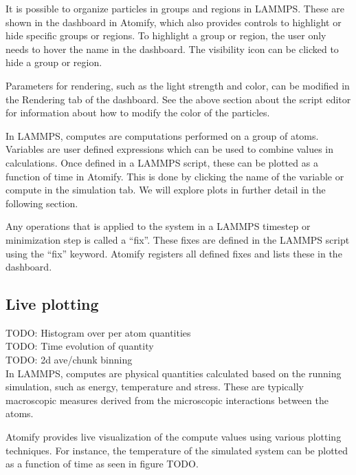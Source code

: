 \documentclass[aps,pre,twocolumn,letterpaper,floatfix,nofootinbib]{revtex4}
\begin{document}
It is possible to organize particles in groups and regions in LAMMPS.
These are shown in the dashboard in Atomify, which also provides controls to
highlight or hide specific groups or regions.
To highlight a group or region, the user only needs to hover the name in the
dashboard.
The visibility icon can be clicked to hide a group or region.

Parameters for rendering, such as the light strength and color,
can be modified in the Rendering tab of the dashboard.
See the above section about the script editor for information about how to
modify the color of the particles.

In LAMMPS, computes are computations performed on a group of atoms.
Variables are user defined expressions which can be used to combine values in
calculations.
Once defined in a LAMMPS script, these can be plotted as a function of time in
Atomify.
This is done by clicking the name of the variable or compute in the simulation
tab.
We will explore plots in further detail in the following section.

Any operations that is applied to the system in a LAMMPS timestep or
minimization step is called a ``fix''.
These fixes are defined in the LAMMPS script using the ``fix'' keyword.
Atomify registers all defined fixes and lists these in the dashboard.

\subsection{Live plotting}
TODO: Histogram over per atom quantities \\
TODO: Time evolution of quantity \\
TODO: 2d ave/chunk binning \\

In LAMMPS, computes are physical quantities calculated based on the running
simulation, such as energy, temperature and stress.
These are typically macroscopic measures derived from the microscopic
interactions between the atoms.

Atomify provides live visualization of the compute values using various plotting
techniques.
For instance, the temperature of the simulated system can be plotted as a
function of time as seen in figure TODO.
\end{document}
